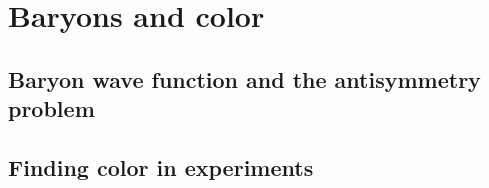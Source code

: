 \section{Baryons and color}

\subsection{Baryon wave function and the antisymmetry problem}

\subsection{Finding color in experiments}
